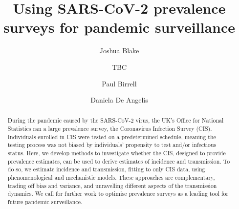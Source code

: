 \documentclass[9pt,twocolumn,twoside]{pnas-new}
\begin{document}
\title{Using SARS-CoV-2 prevalence surveys for pandemic surveillance}

\author[a]{Joshua Blake}
\author[]{TBC}
\author[b,a]{Paul Birrell}
\author[a,b]{Daniela De Angelis}






\begin{abstract}
During the pandemic caused by the SARS-CoV-2 virus, the UK’s Office for National Statistics ran a large prevalence survey, the Coronavirus Infection Survey (CIS).
Individuals enrolled in CIS were tested on a predetermined schedule, meaning the testing process was not biased by individuals' propensity to test and/or infectious status.
Here, we develop methods to investigate whether the CIS, designed to provide prevalence estimates, can be used to derive estimates of incidence and transmission.
To do so, we estimate incidence and transmission, fitting to only CIS data, using phenomenological and mechanistic models.
These approaches are complementary, trading off bias and variance, and unravelling different aspects of the transmission dynamics.
We call for further work to optimise prevalence surveys as a leading tool for future pandemic surveillance.
\end{abstract}
\end{document}

